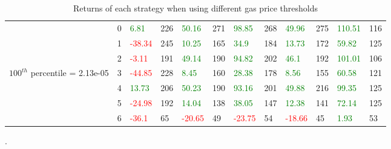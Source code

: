 \begin{table}[htb!]
\begin{adjustwidth}{-0.9in}{-0.9in}
\begin{tabular}{|p{5em}|p{2em}|p{3em}|p{3em}|p{3em}|p{3em}|p{3em}|p{3em}|p{3em}|p{3em}|p{3em}|p{3em}|}
            & 0 & \textcolor{green}{6.81} & 226 & \textcolor{green}{50.16} & 271 & \textcolor{green}{98.85} & 268 & \textcolor{green}{49.96} & 275 & \textcolor{green}{110.51} & 116\\\cline{3-12}
            & 1 & \textcolor{red}{-38.34} & 245 & \textcolor{green}{10.25} & 165 & \textcolor{green}{34.9} & 184 & \textcolor{green}{13.73} & 172 & \textcolor{green}{59.82} & 125\\\cline{3-12}
            & 2 & \textcolor{red}{-3.11} & 191 & \textcolor{green}{49.14} & 190 & \textcolor{green}{94.82} & 202 & \textcolor{green}{46.1} & 192 & \textcolor{green}{101.01} & 106\\\cline{3-12}
            $100^{th}$ percentile = 2.13e-05 & 3 & \textcolor{red}{-44.85} & 228 & \textcolor{green}{8.45} & 160 & \textcolor{green}{28.38} & 178 & \textcolor{green}{8.56} & 155 & \textcolor{green}{60.58} & 121\\[-5.5ex]\cline{3-12}
            & 4 & \textcolor{green}{13.73} & 206 & \textcolor{green}{50.23} & 190 & \textcolor{green}{93.16} & 201 & \textcolor{green}{49.88} & 216 & \textcolor{green}{99.35} & 125\\\cline{3-12}
            & 5 & \textcolor{red}{-24.98} & 192 & \textcolor{green}{14.04} & 138 & \textcolor{green}{38.05} & 147 & \textcolor{green}{12.38} & 141 & \textcolor{green}{72.14} & 125\\\cline{3-12}
            & 6 & \textcolor{red}{-36.1} & 65 & \textcolor{red}{-20.65} & 49 & \textcolor{red}{-23.75} & 54 & \textcolor{red}{-18.66} & 45 & \textcolor{green}{1.93} & 53\\\hline
        \end{tabular}
    \end{adjustwidth}
    \caption{Returns of each strategy when using different gas price thresholds \label{tab:VaryGasPriceThresholds}}.
\end{table}


